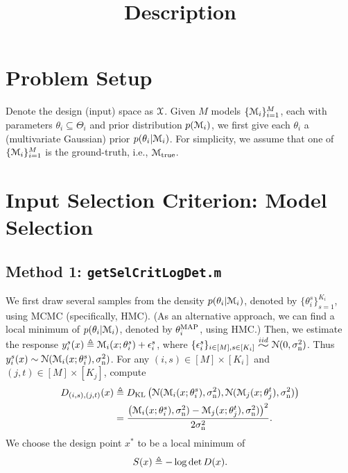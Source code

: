 \documentclass[11pt]{article}
\title{Description}
\date{}
\numberwithin{equation}{section}
\begin{document}
\maketitle



\section{Problem Setup}
Denote the design (input) space as $\mathcal{X}$. 
Given $M$ models $\{\mathcal{M}_i\}_{i=1}^M$, each with parameters $\theta_i%
\subseteq \Theta_i$ and prior distribution $p(\mathcal{M}_i)$, we first give each $\theta_i$ a (multivariate Gaussian) prior $p(\theta_i|\mathcal{M}_i)$. For simplicity, we assume that one of $\{\mathcal{M}_i\}_{i=1}^M$ is the ground-truth, i.e., $\mathcal{M}_{\rm true}$.


\section{Input Selection Criterion: Model Selection}

\subsection{Method 1: {\tt getSelCritLogDet.m}}\label{sec:method_1}
We first draw several samples from the density $p(\theta_i|\mathcal{M}_i)$, denoted by $\{\theta_i^s\}_{s=1}^{K_i}$,  using MCMC (specifically, HMC). (As an alternative approach, we can find a local minimum of $p(\theta_i|\mathcal{M}_i)$, denoted by $\theta_i^{\rm MAP}$, using HMC.)
Then, we estimate the response $y_{i}^s(x) \triangleq \mathcal{M}_i(x;\theta_i^s)+\epsilon_{i}^s$, where $\{\epsilon_{i}^s\}_{i\in[M],s\in[K_i]}\iidsim\calN(0,\sigma_\rmn^2)$. Thus $y_{i}^s(x) \sim \mathcal{N}(\mathcal{M}_i(x;\theta_i^s),\sigma_{\mathrm{n}}^2)$. For any $(i,s)\in[M]\times[K_i]$ and $(j,t)\in[M]\times[K_j]$, compute
\begin{align*}
D_{(i,s),(j,t)}(x) &\triangleq D_{\rm KL}\left(\mathcal{N}(\mathcal{M}_i(x;\theta_i^s),\sigma_{\mathrm{n}}^2),\mathcal{N}(\mathcal{M}_j(x;\theta_j^t),\sigma_{\mathrm{n}}^2)\right)\\
&= \frac{\left(\mathcal{M}_i(x;\theta_i^s),\sigma_{\mathrm{n}}^2) - \mathcal{M}_j(x;\theta_j^t),\sigma_{\mathrm{n}}^2)\right)^2}{2\sigma_{\mathrm{n}}^2}. 
\end{align*}
We choose the design point $x^*$ to be a local minimum of 
\begin{align*}
S(x) \triangleq -\log\det D(x). 
\end{align*}
\end{document}
